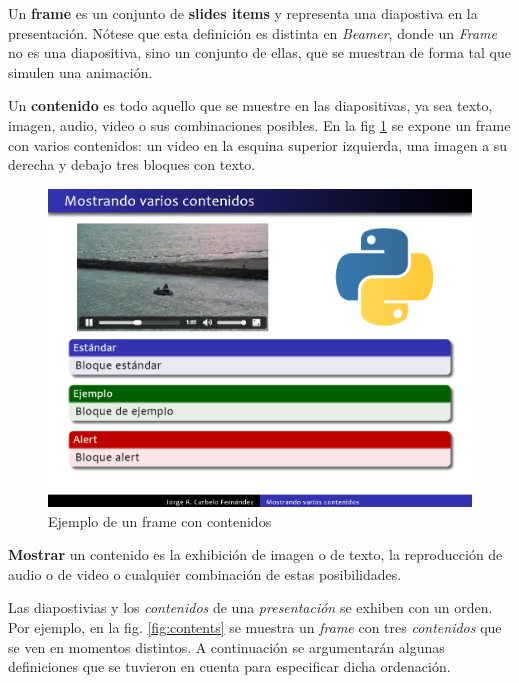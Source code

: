  		\begin{definition}
 		\label{def:frame}
			Un \textbf{frame} es un conjunto de \textbf{slides items} y representa una diapostiva en la presentación. Nótese que esta definición es distinta en \textit{Beamer}, donde un \textit{Frame} no es una diapositiva, sino un conjunto de ellas, que se muestran de forma tal que simulen una animación.
 		\end{definition}		

		\begin{definition}
		\label{def:content}
			Un \textbf{contenido} es todo aquello que se muestre en las diapositivas, ya sea texto, imagen, audio, video o sus combinaciones posibles. En la fig \ref{fig:frame_video_image} se expone un frame con varios contenidos: un video en la esquina superior izquierda, una imagen a su derecha y debajo tres bloques con texto.
		\end{definition}
 		\begin{figure}[tb]
 			\centering
 			\includegraphics[width=12cm]{img/frame-video-image}
 			\caption{Ejemplo de un frame con contenidos}
 			\label{fig:frame_video_image}
 		\end{figure} 		

		\begin{definition}
		\label{def:show}
			\textbf{Mostrar} un contenido es la exhibición de imagen o de texto, la reproducción de audio o de video o cualquier combinación de estas posibilidades.
		\end{definition} 		

		Las diapostivias y los \textit{contenidos} de una \textit{presentación} se exhiben con un orden. Por ejemplo, en la fig. \ref{fig:contents} se muestra un \textit{frame} con tres \textit{contenidos} que se ven en momentos distintos. A continuación se argumentarán algunas definiciones que se tuvieron en cuenta para especificar dicha ordenación.

